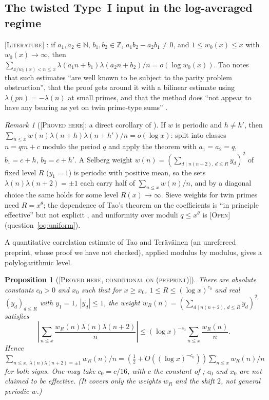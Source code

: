 \documentclass[11pt]{amsart}
\newtheorem{proposition}[theorem]{Proposition}
\theoremstyle{definition}
\theoremstyle{remark}
\newtheorem{remark}[theorem]{Remark}
\newcommand{\lbl}[1]{\textup{\textsc{[#1]}}}
\begin{document}
\subsection{The twisted Type~I input in the log-averaged regime}\label{subsec:typeI}

\lbl{Literature} \cite[Theorem~1.2]{Tao16}: if $a_1,a_2\in\mathbb N$,
$b_1,b_2\in\mathbb Z$, $a_1b_2-a_2b_1\ne0$, and $1\le w_0(x)\le x$ with
$w_0(x)\to\infty$, then
$\sum_{x/w_0(x)<n\le x}\lambda(a_1n+b_1)\lambda(a_2n+b_2)/n=o(\log w_0(x))$.
Tao notes that such estimates ``are well known to be subject to the parity
problem obstruction'', that the proof gets around it with a bilinear
estimate using $\lambda(pn)=-\lambda(n)$ at small primes, and that the method
does ``not appear to have any bearing as yet on twin prime-type sums''
\cite[pp.~3--5]{Tao16}.

\begin{remark}[\lbl{Proved here}; a direct corollary of {\cite[Theorem~1.2]{Tao16}}]\label{rem:tao-weight}
If $w$ is periodic and $h\ne h'$, then
$\sum_{n\le x}w(n)\lambda(n+h)\lambda(n+h')/n=o(\log x)$: split into classes
$n=qm+c$ modulo the period $q$ and apply the theorem with $a_1=a_2=q$,
$b_1=c+h$, $b_2=c+h'$. A
Selberg weight $w(n)=\left(\sum_{d\mid n(n+2),\,d\le R}y_d\right)^2$ of fixed
level $R$ ($y_1=1$) is periodic with positive mean, so the sets
$\lambda(n)\lambda(n+2)=\pm1$ each carry half of $\sum_{n\le x}w(n)/n$, and by
a diagonal choice the same holds for some level $R(x)\to\infty$. Sieve
weights for twin primes need $R=x^{\theta}$; the dependence of Tao's theorem
on the coefficients is ``in principle effective'' but not explicit
\cite[Remark~1.4, on Theorem~1.3]{Tao16}, and uniformity over moduli
$q\le x^{\theta}$ is \lbl{Open} (question~\ref{oq:uniform}).
\end{remark}

A quantitative correlation estimate of Tao and Ter\"av\"ainen
\cite[Theorem~3.1]{TT25} (an unrefereed preprint, whose proof we have not
checked), applied modulus by modulus, gives a polylogarithmic level.

\begin{proposition}[\lbl{Proved here, conditional on \cite[Theorem~3.1]{TT25} (preprint)}]
\label{prop:tao-weight-logc}
There are absolute constants $c_0>0$ and $x_0$ such that for $x\ge x_0$,
$1\le R\le(\log x)^{c_0}$ and real $(y_d)_{d\le R}$ with $y_1=1$,
$|y_d|\le1$, the weight
$w_R(n)=\left(\sum_{d\mid n(n+2),\,d\le R}y_d\right)^2$ satisfies
\[
\left|\sum_{n\le x}\frac{w_R(n)\lambda(n)\lambda(n+2)}{n}\right|
\le(\log x)^{-c_0}\sum_{n\le x}\frac{w_R(n)}{n}.
\]
Hence $\sum_{n\le x,\ \lambda(n)\lambda(n+2)=\pm1}w_R(n)/n
=\left(\tfrac12+O((\log x)^{-c_0})\right)\sum_{n\le x}w_R(n)/n$ for both signs.
One may take $c_0=c/16$, with $c$ the constant of \cite[Theorem~3.1]{TT25};
$c_0$ and $x_0$ are not claimed to be effective. (It covers only the weights
$w_R$ and the shift $2$, not general periodic $w$.)
\end{proposition}
\end{document}
